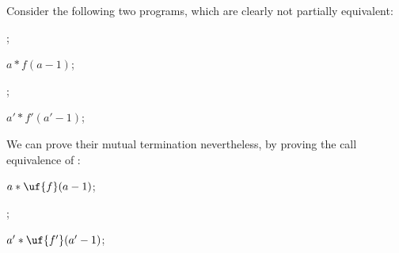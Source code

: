 
\begin{example} \label{ex:mterm}
Consider the following two programs, which are clearly not partially equivalent:

\vspace{0.2 cm}
\begin{minipage}{5.5 cm}
\begin{algorithmic}

 \State {};

\EndIf

\Return $a * f(a - 1)$;

\EndFunction
\end{algorithmic}
\end{minipage}
\begin{minipage}{5.5 cm}
\begin{algorithmic}

 \State {};

\EndIf

\State \Return $a' * f'(a' - 1)$;

\EndFunction
\end{algorithmic}
\end{minipage}
\vspace{0.2 cm}
%

\noindent
We can prove their mutual termination nevertheless, by proving the call equivalence of :

\vspace{0.2 cm}
\begin{minipage}{5.5 cm}
\begin{algorithmic}

 \State {} \EndIf

\State \Return $a * \uf{f}( a - 1 )$;

\EndFunction
\end{algorithmic}
\end{minipage}
%
\begin{minipage}{5.5 cm}
\begin{algorithmic}

 \State {}; \EndIf

\State \Return $a' * \uf{f'}( a' - 1 )$;

\EndFunction
\end{algorithmic}
\end{minipage}
\vspace{0.2 cm}
%


\end{example}
